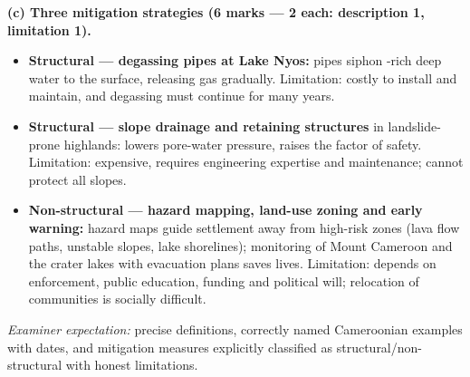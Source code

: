 \documentclass[11pt]{article}
\begin{document}
\begin{corrige}
\textbf{(c) Three mitigation strategies (6 marks — 2 each: description 1, limitation 1).}
\begin{itemize}
\item \textbf{Structural — degassing pipes at Lake Nyos:} pipes siphon -rich deep water to the surface, releasing gas gradually. Limitation: costly to install and maintain, and degassing must continue for many years.
\item \textbf{Structural — slope drainage and retaining structures} in landslide-prone highlands: lowers pore-water pressure, raises the factor of safety. Limitation: expensive, requires engineering expertise and maintenance; cannot protect all slopes.
\item \textbf{Non-structural — hazard mapping, land-use zoning and early warning:} hazard maps guide settlement away from high-risk zones (lava flow paths, unstable slopes, lake shorelines); monitoring of Mount Cameroon and the crater lakes with evacuation plans saves lives. Limitation: depends on enforcement, public education, funding and political will; relocation of communities is socially difficult.
\end{itemize}
\emph{Examiner expectation:} precise definitions, correctly named Cameroonian examples with dates, and mitigation measures explicitly classified as structural/non-structural with honest limitations.
\end{corrige}
\end{document}
